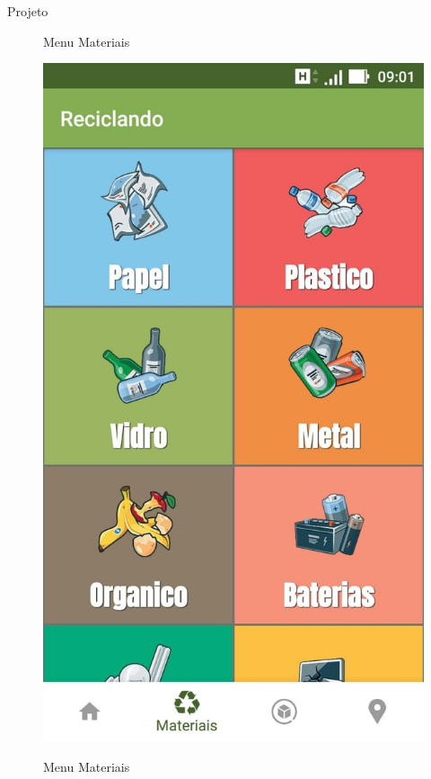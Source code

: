 \documentclass[
	12pt,				%
	openright,			%
	twoside,			%
	a4paper,			%
	english,			%
	french,				%
	spanish,			%
	brazil				%
	]{abntex2}
\begin{document}
\begin{chapter}{Projeto}
    \begin{figure}[htb]    
 \centering
  \begin{minipage}{0.45\textwidth}
    \centering
    \caption{Menu Materiais}
    \includegraphics[scale=0.35]{media/tela_menu_material_1.jpg}
     \label{fig:tela_menu_material_1}
  \end{minipage}
  \hfill
  \begin{minipage}{0.45\textwidth}
    \centering
    \caption{Menu Materiais}

\end{minipage}
\end{figure}
\end{chapter}
\end{document}
